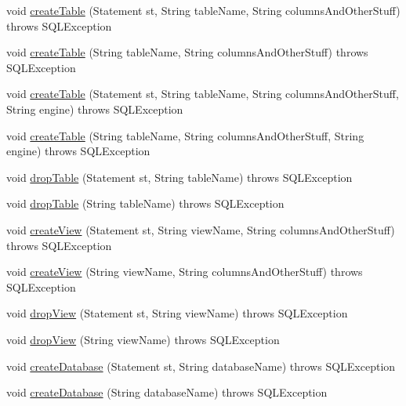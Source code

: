 \begin{DoxyCompactItemize}
\item 
void \mbox{\hyperlink{classtestsuite_1_1_base_test_case_a9b100bed1696694cdede1b8181bdf70a}{create\+Table}} (Statement st, String table\+Name, String columns\+And\+Other\+Stuff)  throws S\+Q\+L\+Exception 
\item 
void \mbox{\hyperlink{classtestsuite_1_1_base_test_case_afa4c0d18646a12915f111869b2275b87}{create\+Table}} (String table\+Name, String columns\+And\+Other\+Stuff)  throws S\+Q\+L\+Exception 
\item 
void \mbox{\hyperlink{classtestsuite_1_1_base_test_case_a16751e4f9c11d900e1d37e7f073950cd}{create\+Table}} (Statement st, String table\+Name, String columns\+And\+Other\+Stuff, String engine)  throws S\+Q\+L\+Exception 
\item 
void \mbox{\hyperlink{classtestsuite_1_1_base_test_case_a46f784bec92e5fb4b4c8fcdb7817c4b3}{create\+Table}} (String table\+Name, String columns\+And\+Other\+Stuff, String engine)  throws S\+Q\+L\+Exception 
\item 
void \mbox{\hyperlink{classtestsuite_1_1_base_test_case_a84f311adb4febe06deab08a132f85eaf}{drop\+Table}} (Statement st, String table\+Name)  throws S\+Q\+L\+Exception 
\item 
void \mbox{\hyperlink{classtestsuite_1_1_base_test_case_a6c0b307be5e764c26f34b91f6d6a6467}{drop\+Table}} (String table\+Name)  throws S\+Q\+L\+Exception 
\item 
void \mbox{\hyperlink{classtestsuite_1_1_base_test_case_a983df40dad5ef6b021807e9e04cc72b7}{create\+View}} (Statement st, String view\+Name, String columns\+And\+Other\+Stuff)  throws S\+Q\+L\+Exception 
\item 
void \mbox{\hyperlink{classtestsuite_1_1_base_test_case_a283fa00242603070d4f3b90350114b56}{create\+View}} (String view\+Name, String columns\+And\+Other\+Stuff)  throws S\+Q\+L\+Exception 
\item 
void \mbox{\hyperlink{classtestsuite_1_1_base_test_case_a3b274340f82f139a17b459cd34092a63}{drop\+View}} (Statement st, String view\+Name)  throws S\+Q\+L\+Exception 
\item 
void \mbox{\hyperlink{classtestsuite_1_1_base_test_case_a5c3ce4b39ab6ae72b494c165fc53a7d3}{drop\+View}} (String view\+Name)  throws S\+Q\+L\+Exception 
\item 
void \mbox{\hyperlink{classtestsuite_1_1_base_test_case_a19d73ebe2a92f5a1813d92d21fcd6431}{create\+Database}} (Statement st, String database\+Name)  throws S\+Q\+L\+Exception 
\item 
void \mbox{\hyperlink{classtestsuite_1_1_base_test_case_aea6308a3defd8463397b835996508c4e}{create\+Database}} (String database\+Name)  throws S\+Q\+L\+Exception 

\end{DoxyCompactItemize}
